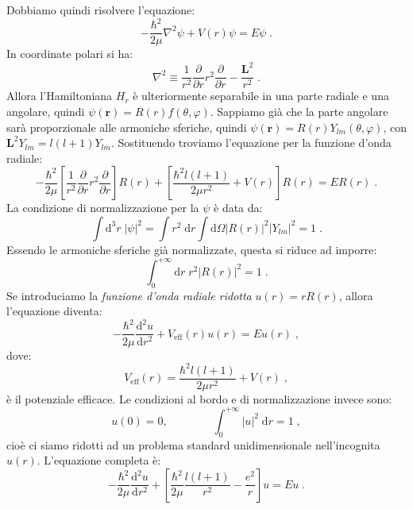 \documentclass[10pt,a4paper]{report}
\theoremstyle{definition}
\newcommand{\dev}[3][]{\frac{\mathrm{d}^{#1} #2}{\mathrm{d} #3^{#1}}}
\numberwithin{equation}{section}
\newcommand{\diff}[1][]{\mathrm{d}#1}
\begin{document}
Dobbiamo quindi risolvere l'equazione:
\begin{equation}
-\frac{\hbar^2}{2\mu}\nabla^2\psi+V(r)\psi=E\psi\;.
\end{equation}
In coordinate polari si ha:
\begin{equation}
\nabla^2\equiv \frac{1}{r^2}\frac{\partial}{\partial r}r^2\frac{\partial}{\partial r}-\frac{\mathbf{L}^2}{r^2}\;.
\end{equation}
Allora l'Hamiltoniana $H_r$ è ulteriormente separabile in una parte radiale e una angolare, quindi $\psi(\mathbf{r})=R(r)f(\theta,\varphi)$. Sappiamo già che la parte angolare sarà proporzionale alle armoniche sferiche, quindi $\psi(\mathbf{r})=R(r)Y_{lm}(\theta,\varphi)$, con $\mathbf{L}^2Y_{lm}=l(l+1)Y_{lm}$. Sostituendo troviamo l'equazione per la funzione d'onda radiale:
\begin{equation}
-\frac{\hbar^2}{2\mu}\left[\frac{1}{r^2}\frac{\partial}{\partial r}r^2\frac{\partial}{\partial r}\right]R(r)+\left[\frac{\hbar^2l(l+1)}{2\mu r^2}+V(r)\right]R(r)=ER(r)\;.
\end{equation}
La condizione di normalizzazione per la $\psi$ è data da:
\begin{equation}
\int \diff^3{r}\;|\psi|^2=\int r^2\;\diff{r}\int \diff{\Omega}|R(r)|^2|Y_{lm}|^2=1\;.
\end{equation}
Essendo le armoniche sferiche già normalizzate, questa si riduce ad imporre:
\begin{equation}
\int_0^{+\infty}\diff{r}\;r^2|R(r)|^2=1\;.
\end{equation}
Se introduciamo la \textit{funzione d'onda radiale ridotta} $u(r)=rR(r)$, allora l'equazione diventa:
\begin{equation}
-\frac{\hbar^2}{2\mu}\dev[2]{u}{r}+V_{\mathrm{eff}}(r)u(r)=Eu(r)\;,
\end{equation}
dove:
\begin{equation}
V_{\mathrm{eff}}(r)=\frac{\hbar^2l(l+1)}{2\mu r^2}+V(r)\;,
\end{equation}
è il potenziale efficace. Le condizioni al bordo e di normalizzazione invece sono:
\begin{equation}
u(0)=0,\qquad\qquad \int_0^{+\infty} |u|^2\;\diff{r}=1\;,
\end{equation}
cioè ci siamo ridotti ad un problema standard unidimensionale nell'incognita $u(r)$. L'equazione completa è:
\begin{equation}
-\frac{\hbar^2}{2\mu}\dev[2]{u}{r}+\left[\frac{\hbar^2}{2\mu}\frac{l(l+1)}{r^2}-\frac{e^2}{r}\right]u=Eu\;.
\end{equation}
\end{document}
